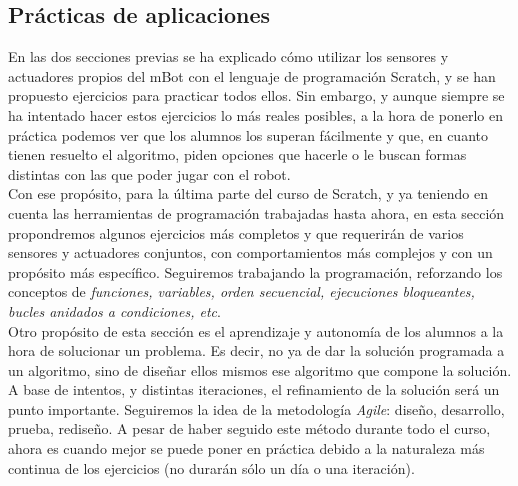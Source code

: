 \subsection{Prácticas de aplicaciones}\label{subsec:practicasaplicaciones}
En las dos secciones previas se ha explicado cómo utilizar los sensores y actuadores propios del mBot con el lenguaje de programación Scratch, y se han propuesto ejercicios para practicar todos ellos. Sin embargo, y aunque siempre se ha intentado hacer estos ejercicios lo más reales posibles, a la hora de ponerlo en práctica podemos ver que los alumnos los superan fácilmente y que, en cuanto tienen resuelto el algoritmo, piden opciones que hacerle o le buscan formas distintas con las que poder jugar con el robot. \\
Con ese propósito, para la última parte del curso de Scratch, y ya teniendo en cuenta las herramientas de programación trabajadas hasta ahora, en esta sección propondremos algunos ejercicios más completos y que requerirán de varios sensores y actuadores conjuntos, con comportamientos más complejos y con un propósito más específico. Seguiremos trabajando la programación, reforzando los conceptos de \textit{funciones, variables, orden secuencial, ejecuciones bloqueantes, bucles anidados a condiciones, etc}. \\
Otro propósito de esta sección es el aprendizaje y autonomía de los alumnos a la hora de solucionar un problema. Es decir, no ya de dar la solución programada a un algoritmo, sino de diseñar ellos mismos ese algoritmo que compone la solución. A base de intentos, y distintas iteraciones, el refinamiento de la solución será un punto importante. Seguiremos la idea de la metodología \textit{Agile}: diseño, desarrollo, prueba, rediseño. A pesar de haber seguido este método durante todo el curso, ahora es cuando mejor se puede poner en práctica debido a la naturaleza más continua de los ejercicios (no durarán sólo un día o una iteración).

